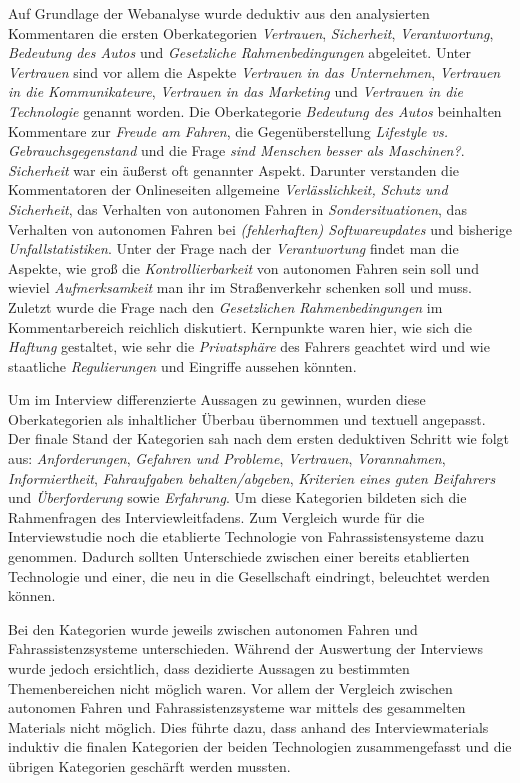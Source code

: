 \documentclass[12pt]{article}
\begin{document}
Auf Grundlage der Webanalyse wurde deduktiv aus den analysierten Kommentaren die ersten Oberkategorien \emph{Vertrauen}, \emph{Sicherheit}, \emph{Verantwortung}, \emph{Bedeutung des Autos} und \emph{Gesetzliche Rahmenbedingungen} abgeleitet.
Unter \emph{Vertrauen} sind vor allem die Aspekte \emph{Vertrauen in das Unternehmen}, \emph{Vertrauen in die Kommunikateure}, \emph{Vertrauen in das Marketing} und \emph{Vertrauen in die Technologie} genannt worden.
Die Oberkategorie \emph{Bedeutung des Autos} beinhalten Kommentare zur \emph{Freude am Fahren}, die Gegenüberstellung \emph{Lifestyle vs. Gebrauchsgegenstand} und die Frage \emph{sind Menschen besser als Maschinen?}.
\emph{Sicherheit} war ein äußerst oft genannter Aspekt. Darunter verstanden die Kommentatoren der Onlineseiten allgemeine \emph{Verlässlichkeit, Schutz und Sicherheit}, das Verhalten von autonomen Fahren in \emph{Sondersituationen}, das Verhalten von autonomen Fahren bei \emph{(fehlerhaften) Softwareupdates} und bisherige \emph{Unfallstatistiken}.
Unter der Frage nach der \emph{Verantwortung} findet man die Aspekte, wie groß die \emph{Kontrollierbarkeit} von autonomen Fahren sein soll und wieviel \emph{Aufmerksamkeit} man ihr im Straßenverkehr schenken soll und muss.
Zuletzt wurde die Frage nach den \emph{Gesetzlichen Rahmenbedingungen} im Kommentarbereich reichlich diskutiert. Kernpunkte waren hier, wie sich die \emph{Haftung} gestaltet, wie sehr die \emph{Privatsphäre} des Fahrers geachtet wird und wie staatliche \emph{Regulierungen} und Eingriffe aussehen könnten.

Um im Interview differenzierte Aussagen zu gewinnen, wurden diese Oberkategorien als inhaltlicher Überbau übernommen und textuell angepasst. Der finale Stand der Kategorien sah nach dem ersten deduktiven Schritt wie folgt aus: \emph{Anforderungen},  \emph{Gefahren und Probleme}, \emph{Vertrauen}, \emph{Vorannahmen}, \emph{Informiertheit}, \emph{Fahraufgaben behalten/abgeben}, \emph{Kriterien eines guten Beifahrers} und \emph{Überforderung} sowie \emph{Erfahrung}. Um diese Kategorien bildeten sich die Rahmenfragen des Interviewleitfadens. Zum Vergleich wurde für die Interviewstudie noch die etablierte Technologie von Fahrassistensysteme dazu genommen. Dadurch sollten Unterschiede zwischen einer bereits etablierten Technologie und einer, die neu in die Gesellschaft eindringt, beleuchtet werden können.

Bei den Kategorien wurde jeweils zwischen autonomen Fahren und Fahrassistenzsysteme unterschieden. Während der Auswertung der Interviews wurde jedoch ersichtlich, dass dezidierte Aussagen zu bestimmten Themenbereichen nicht möglich waren. Vor allem der Vergleich zwischen autonomen Fahren und Fahrassistenzsysteme war mittels des gesammelten Materials nicht möglich. Dies führte dazu, dass anhand des Interviewmaterials induktiv die finalen Kategorien der beiden Technologien zusammengefasst und die übrigen Kategorien geschärft werden mussten. %
\end{document}
